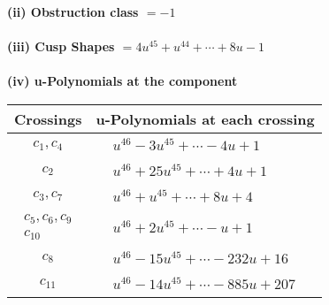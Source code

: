 \documentclass[1p]{elsarticle_modified}
\theoremstyle{definition}
\begin{document}
\flushleft \textbf{(ii) Obstruction class $= -1$}\\~\\
\flushleft \textbf{(iii) Cusp Shapes $= 4 u^{45}+u^{44}+\cdots+8 u-1$}\\~\\
\newpage\renewcommand{\arraystretch}{1}
\flushleft \textbf{(iv) u-Polynomials at the component}\newline \\
\begin{tabular}{m{50pt}|m{274pt}}
Crossings & \hspace{64pt}u-Polynomials at each crossing \\
\hline $$\begin{aligned}c_{1},c_{4}\end{aligned}$$&$\begin{aligned}
&u^{46}-3 u^{45}+\cdots-4 u+1
\end{aligned}$\\
\hline $$\begin{aligned}c_{2}\end{aligned}$$&$\begin{aligned}
&u^{46}+25 u^{45}+\cdots+4 u+1
\end{aligned}$\\
\hline $$\begin{aligned}c_{3},c_{7}\end{aligned}$$&$\begin{aligned}
&u^{46}+u^{45}+\cdots+8 u+4
\end{aligned}$\\
\hline $$\begin{aligned}c_{5},c_{6},c_{9}\\c_{10}\end{aligned}$$&$\begin{aligned}
&u^{46}+2 u^{45}+\cdots- u+1
\end{aligned}$\\
\hline $$\begin{aligned}c_{8}\end{aligned}$$&$\begin{aligned}
&u^{46}-15 u^{45}+\cdots-232 u+16
\end{aligned}$\\
\hline $$\begin{aligned}c_{11}\end{aligned}$$&$\begin{aligned}
&u^{46}-14 u^{45}+\cdots-885 u+207
\end{aligned}$\\
\hline
\end{tabular}\\~\\
\end{document}
